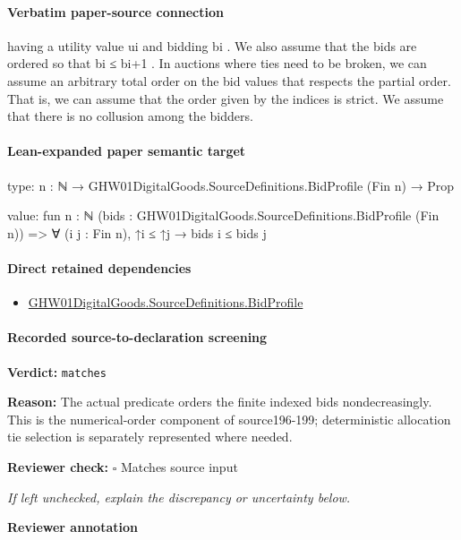 \documentclass[10pt]{article}
\newcommand{\reviewerbox}{%
  \par\noindent\fbox{\parbox{0.96\linewidth}{\rule{0pt}{0.38in}}}\par
}
\newcommand{\reviewmatch}[1]{%
  \par\noindent\textbf{Reviewer check:} $\square$\; #1\par
  \noindent\emph{If left unchecked, explain the discrepancy or uncertainty below.}\par
}
\begin{document}
\paragraph{Verbatim paper-source connection}
\begin{ReviewVerbatim}
having a utility value ui and bidding bi . We also assume that the bids are ordered so that bi ≤ bi+1 . In
auctions where ties need to be broken, we can assume an arbitrary total order on the bid values that
respects the partial order. That is, we can assume
that the order given by the indices is strict. We assume that there is no collusion among the bidders.
\end{ReviewVerbatim}



\paragraph{Lean-expanded paper semantic target}
\begin{ReviewVerbatim}
type:
{n : ℕ} → GHW01DigitalGoods.SourceDefinitions.BidProfile (Fin n) → Prop

value:
fun {n : ℕ} (bids : GHW01DigitalGoods.SourceDefinitions.BidProfile (Fin n)) =>
  ∀ (i j : Fin n), ↑i ≤ ↑j → bids i ≤ bids j
\end{ReviewVerbatim}

\paragraph{Direct retained dependencies}
\begin{itemize}\raggedright
\item \hyperlink{paper-prerequisite-ac8769d0dccf04f4}{GHW01\allowbreak{}Digital\allowbreak{}Goods.\allowbreak{}Source\allowbreak{}Definitions.\allowbreak{}Bid\allowbreak{}Profile}
\end{itemize}
\paragraph{Recorded source-to-declaration screening}
\textbf{Verdict:} \texttt{matches}
\\
{\raggedright
\textbf{Reason:} The actual predicate orders the finite indexed bids nondecreasingly.\allowbreak{} This is the numerical-\allowbreak{}order component of source196-\allowbreak{}199;\allowbreak{} deterministic allocation tie selection is separately represented where needed.\allowbreak{}
\par}
\reviewmatch{Matches source input}
\noindent\textbf{Reviewer annotation}\par
\reviewerbox
\clearpage
\hypertarget{paper-prerequisite-4178ea3b672e0864}{}
\end{document}
